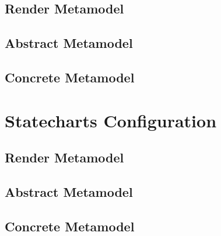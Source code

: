 \subsection*{Render Metamodel}


\subsection*{Abstract Metamodel}


\subsection*{Concrete Metamodel}
\raggedbottom


\newpage
\section{Statecharts Configuration}
\label{app:state}
\subsection*{Render Metamodel}


\subsection*{Abstract Metamodel}


\subsection*{Concrete Metamodel}



